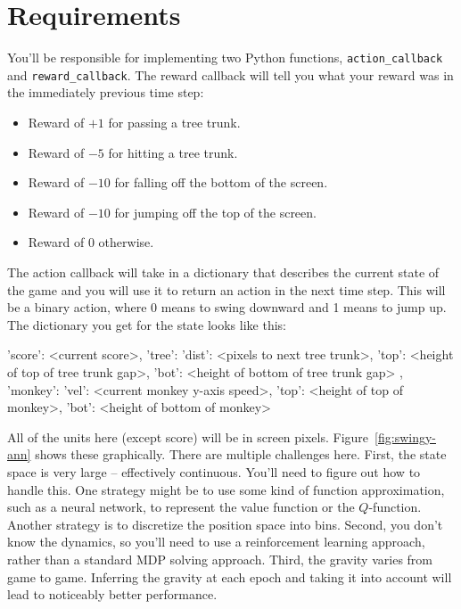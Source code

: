 \documentclass[12pt]{article}
\begin{document}
\section*{Requirements}

You'll be responsible for implementing two Python functions, \verb|action_callback| and \verb|reward_callback|.  The reward callback will tell you what your reward was in the immediately previous time step:
\begin{itemize}
    \item Reward of $+1$ for passing a tree trunk.
    \item Reward of $-5$ for hitting a tree trunk.
    \item Reward of $-10$ for falling off the bottom of the screen.
    \item Reward of $-10$ for jumping off the top of the screen.
    \item Reward of $0$ otherwise.
\end{itemize}
The action callback will take in a dictionary that describes the current state of the game and you will use it to return an action in the next time step.  This will be a binary action, where 0 means to swing downward and 1 means to jump up.  The dictionary you get for the state looks like this:
\begin{csv}
{ 'score': <current score>,
  'tree': { 'dist': <pixels to next tree trunk>,
            'top':  <height of top of tree trunk gap>,
            'bot':  <height of bottom of tree trunk gap> },
  'monkey': { 'vel': <current monkey y-axis speed>,
              'top': <height of top of monkey>,
              'bot': <height of bottom of monkey> }}
\end{csv}
All of the units here (except score) will be in screen pixels. Figure~\ref{fig:swingy-ann} shows these graphically. There are multiple challenges here.  First, the state space is very large -- effectively continuous.  You'll need to figure out how to handle this.  One strategy might be to use some kind of function approximation, such as a neural network, to represent the value function or the $Q$-function.  Another strategy is to discretize the position space into bins.  Second, you don't know the dynamics, so you'll need to use a reinforcement learning approach, rather than a standard MDP solving approach. Third, the gravity varies from game to game. Inferring the gravity at each epoch and taking it into account will lead to noticeably better performance.
\end{document}
